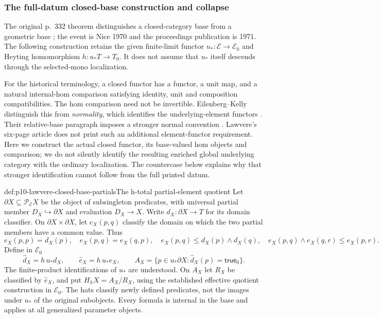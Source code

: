 \subsubsection{The full-datum closed-base construction and collapse}

The original p.~332 theorem distinguishes a closed-category base from a
geometric base \cite[p.~332]{Lawvere1970}; the event is Nice 1970 and the
proceedings publication is 1971. The following construction retains the
given finite-limit functor \(u_*:\mathcal E\to\mathcal E_0\) and
Heyting homomorphism \(h:u_*T\to T_0\). It does not assume that
\(u_*\) itself descends through the selected-mono localization.

For the historical terminology, a closed functor has a functor, a unit
map, and a natural internal-hom comparison satisfying identity, unit and
composition compatibilities. The hom comparison need not be invertible.
Eilenberg--Kelly distinguish this from \emph{normality}, which identifies
the underlying-element functors \cite[pp.~433--434,439]{EilenbergKelly1966}.
Their relative-base paragraph imposes a stronger normal convention
\cite[p.~549]{EilenbergKelly1966}. Lawvere's six-page article does not
print such an additional element-functor requirement. Here we construct
the actual closed functor, its base-valued hom objects and comparison;
we do not silently identify the resulting enriched global underlying
category with the ordinary localization. The countercase below explains
why that stronger identification cannot follow from the full printed datum.

\begin{hbdefinition}{def:p10-lawvere-closed-base-partials}{The h-total partial-element quotient}
Let \(\partial X\subseteq\mathcal P_{\mathcal E}X\) be the object
of subsingleton predicates, with universal partial member
\(D_X\hookrightarrow\partial X\) and evaluation \(D_X\to X\).
Write \(d_X:\partial X\to T\) for its domain classifier. On
\(\partial X\times\partial X\), let
\(e_X(p,q)\) classify the domain on which the two partial members
have a common value. Thus
\[
 e_X(p,p)=d_X(p),\quad e_X(p,q)=e_X(q,p),\quad
 e_X(p,q)\le d_X(p)\wedge d_X(q),\quad
 e_X(p,q)\wedge e_X(q,r)\le e_X(p,r).
\]
Define in \(\mathcal E_0\)
\[
 \widehat d_X=h\,u_*d_X,\qquad \widehat e_X=h\,u_*e_X,
 \qquad A_X=\{p\in u_*\partial X:\widehat d_X(p)=\mathsf{true}_0\}.
\]
The finite-product identifications of \(u_*\) are understood.
On \(A_X\) let \(R_X\) be classified by \(\widehat e_X\),
and put \(H_hX=A_X/R_X\), using the established effective quotient
construction in \(\mathcal E_0\). The hats classify newly defined
predicates, not the images under \(u_*\) of the original subobjects.
Every formula is internal in the base and applies at all generalized
parameter objects.
\end{hbdefinition}

